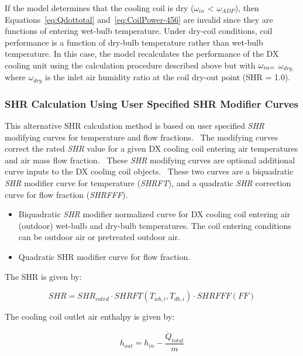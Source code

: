 If the model determines that the cooling coil is dry (\(\omega_{in}\) \textless{} \(\omega_{ADP}\)), then Equations~\ref{eq:Qdottotal} and~\ref{eq:CoilPower-456} are invalid since they are functions of entering wet-bulb temperature. Under dry-coil conditions, coil performance is a function of dry-bulb temperature rather than wet-bulb temperature. In this case, the model recalculates the performance of the DX cooling unit using the calculation procedure described above but with \(\omega_{in\\ =}\) \(\omega_{dry,}\) where \(\omega_{dry}\) is the inlet air humidity ratio at the coil dry-out point (SHR = 1.0).

\subsubsection{SHR Calculation Using User Specified SHR Modifier Curves}\label{shr-calculation-using-user-specified-shr-modifier-curves}

This alternative SHR calculation method is based on user specified \emph{SHR} modifying curves for temperature and flow fractions.~ The modifying curves correct the rated \emph{SHR} value for a given DX cooling coil entering air temperatures and air mass flow fraction.~ These \emph{SHR} modifying curves are optional additional curve inputs to the DX cooling coil objects.~ These two curves are a biquadratic \emph{SHR} modifier curve for temperature (\emph{SHRFT}), and a quadratic \emph{SHR} correction curve for flow fraction (\emph{SHRFFF}).

\begin{itemize}
\item Biquadratic \emph{SHR} modifier normalized curve for DX cooling coil entering air (outdoor) wet-bulb and dry-bulb temperatures. The coil entering conditions can be outdoor air or pretreated outdoor air.
\item Quadratic SHR modifier curve for flow fraction.
\end{itemize}

The SHR is given by:

\begin{equation}
SHR = SH{R_{rated}} \cdot SHRFT\left( {{T_{wb,i}},{T_{db,i}}} \right) \cdot SHRFFF\left( {FF} \right)
\end{equation}

The cooling coil outlet air enthalpy is given by:

\begin{equation}
{h_{out}} = {h_{in}} - \frac{{{{\dot Q}_{total}}}}{{\dot m}}
\end{equation}


